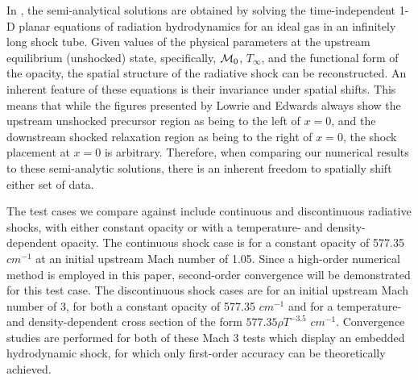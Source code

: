 \documentclass[times,doublespace]{fldauth}%
\begin{document}
In \cite{LowrieEdwards}, the semi-analytical solutions are obtained by solving the time-independent 1-D planar equations of radiation hydrodynamics for an ideal gas in an infinitely long shock tube.
Given values of the physical parameters at the upstream equilibrium (unshocked) state, specifically, ${\cal M}_0$, $T_{\infty}$, and the functional form of the opacity, the spatial structure of the radiative shock can be reconstructed.
An inherent feature of these equations is their invariance under spatial shifts.
This means that while the figures presented by Lowrie and Edwards \cite{LowrieEdwards} always show the upstream unshocked precursor region as being to the left of $x = 0$, and the downstream shocked relaxation region as being to the right of $x = 0$, the shock placement at $x = 0$ is arbitrary.
Therefore, when comparing our numerical results to these semi-analytic solutions, there is an inherent freedom to spatially shift either set of data.

The test cases we compare against include continuous and discontinuous radiative shocks, with either constant opacity or with a temperature- and density-dependent opacity.
The continuous shock case is for a constant opacity of 577.35 $cm^{-1}$ at an initial upstream Mach number of 1.05.
Since a high-order numerical method is employed in this paper, second-order convergence will be demonstrated for this test case.
The discontinuous shock cases are for an initial upstream Mach number of 3, for both a constant opacity of 577.35 $cm^{-1}$ and for a temperature- and density-dependent cross section of the form $577.35 \rho T^{-3.5}$ $cm^{-1}$.
Convergence studies are performed for both of these Mach 3 tests which display an embedded hydrodynamic shock, for which only first-order accuracy can be theoretically achieved.
\end{document}
